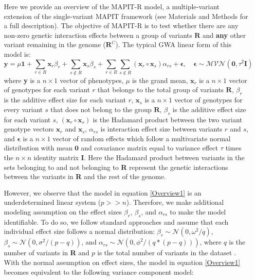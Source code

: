 \documentclass[12pt,a4paper]{article}
\begin{document}
Here we provide an overview of the MAPIT-R model, a multiple-variant extension of the single-variant MAPIT framework (see Materials and Methods for a full description). The objective of MAPIT-R is to test whether there are any non-zero genetic interaction effects between a group of variants $\textbf{R}$ and \textbf{any} other variant remaining in the genome ($\textbf{R}^C$). The typical GWA linear form of this model is:  
\begin{equation}\label{Overview1}
\textbf{y} = \mu\textbf{1} + \sum_{r \in R} \textbf{x}_r\beta_r + \sum_{s \not\in R} \textbf{x}_s\beta_s + \sum_{r \in R}\sum_{s \not\in R} (\textbf{x}_r \circ \textbf{x}_s)\alpha_{rs} + \boldsymbol{\epsilon}, \quad \boldsymbol{\epsilon} \sim \mathcal{MVN}(\textbf{0}, \tau^{2}\textbf{I})  
\end{equation}
where \textbf{y} is a $n \times 1$ vector of phenotypes, $\mu$ is the grand mean, $\textbf{x}_r$ is a $n \times 1$ vector of genotypes for each variant $r$ that belongs to the total group of variants $\textbf{R}$, $\beta_r$ is the additive effect size for each variant $r$, $\textbf{x}_s$ is a $n \times 1$ vector of genotypes for every variant $s$ that does not belong to the group $\textbf{R}$, $\beta_s$ is the additive effect size for each variant $s$, $(\textbf{x}_r \circ \textbf{x}_s)$ is the Hadamard product between the two variant genotype vectors $\textbf{x}_r$ and $\textbf{x}_s$, $\alpha_{rs}$ is interaction effect size between variants $r$ and $s$, and $\boldsymbol{\epsilon}$ is a $n \times 1$ vector of random effects which follow a multivariate normal distribution with mean $\textbf{0}$ and covariance matrix equal to variance effect $\tau$ times the $n \times n$ identity matrix $\textbf{I}$. Here the Hadamard product between variants in the sets belonging to and not belonging to \textbf{R} represent the genetic interactions between the variants in \textbf{R} and the rest of the genome.

However, we observe that the model in equation \ref{Overview1} is an underdetermined linear system ($p >> n$). Therefore, we make additional modeling assumption on the effect sizes $\beta_r$, $\beta_s$, and $\alpha_{rs}$ to make the model identifiable. To do so, we follow standard approaches \citep{Wu2011,Zhou2013,Yang2010} and assume that each individual effect size follows a normal distribution: $\beta_r \sim \mathcal{N}(0, \omega^2/q)$, $\beta_s \sim \mathcal{N}(0, \sigma^2/(p-q))$, and $\alpha_{rs} \sim \mathcal{N}(0, \phi^2/(q*(p-q)))$, where $q$ is the number of variants in \textbf{R} and $p$ is the total number of variants in the dataset \citep{Crawford2017a}. With the normal assumption on effect sizes, the model in equation \ref{Overview1} becomes equivalent to the following variance component model:
\end{document}
